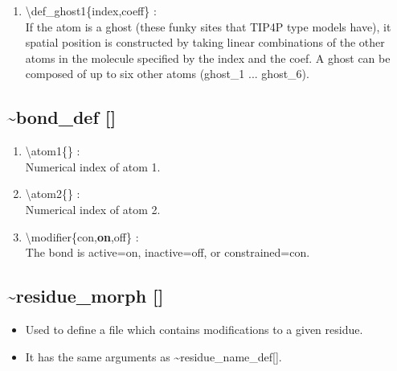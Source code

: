 \documentclass[12pt,titlepage]{article}
\begin{document}
\begin{enumerate}
 \vspace{0.15in} 
 \item  \textbackslash{}def\_ghost1\{index,coeff\} : \\ 
    If the atom is a ghost (these funky sites that TIP4P type
    models have), it spatial position is constructed by taking linear 
    combinations of the other atoms in the molecule specified by the index 
    and the coef. A ghost can be composed of up to six other atoms
    (ghost\_1{} ... ghost\_6{}).

\end{enumerate}

\newpage
\subsection*{\bf \~{ }bond\_def []}

\begin{enumerate}
 \vspace{0.15in} 
 \item  \textbackslash{}atom1\{\} : \\
   Numerical index of atom 1.

 \vspace{0.15in} 
 \item  \textbackslash{}atom2\{\} : \\
   Numerical index of atom 2.

 \vspace{0.15in} 
 \item  \textbackslash{}modifier\{con,{\bf on},off\} : \\
   The bond is active=on, inactive=off, or constrained=con.

\end{enumerate}

\newpage

\subsection*{\bf \~{ }residue\_morph []}
\begin{itemize}
  \item Used to define a file which contains modifications to 
              a given residue.
  \item It has the same arguments as \~{ }residue\_name\_def[].
\end{itemize}
\end{document}
